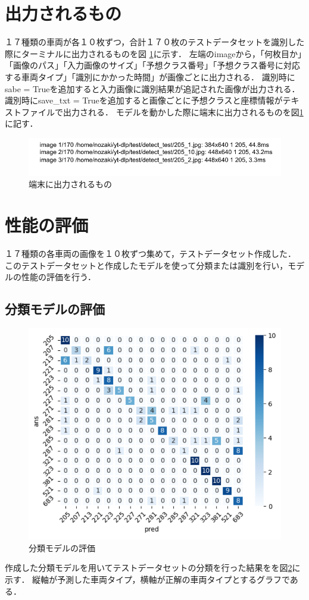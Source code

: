 \section{出力されるもの}
１７種類の車両が各１０枚ずつ，合計１７０枚のテストデータセットを識別した際にターミナルに出力されるものを図 \ref{output}に示す．
左端のimageから，「何枚目か」「画像のパス」「入力画像のサイズ」「予想クラス番号」「予想クラス番号に対応する車両タイプ」「識別にかかった時間」が画像ごとに出力される．
識別時にsabe = Trueを追加すると入力画像に識別結果が追記された画像が出力される．
識別時にsave\_txt = Trueを追加すると画像ごとに予想クラスと座標情報がテキストファイルで出力される．
モデルを動かした際に端末に出力されるものを図\ref{output}に記す．
\begin{figure}	
	\centering
	\includegraphics[width=\linewidth]{fig/a.pdf}
	\caption{端末に出力されるもの}\label{output}
\end{figure}

\section{性能の評価}
１７種類の各車両の画像を１０枚ずつ集めて，テストデータセット作成した．
このテストデータセットと作成したモデルを使って分類または識別を行い，モデルの性能の評価を行う．
\subsection{分類モデルの評価}
\begin{figure}	
	\centering
	\includegraphics[width=\linewidth]{chap4/fig/classify_results.pdf}
	\caption{分類モデルの評価}
	\label{CLS}
\end{figure}
作成した分類モデルを用いてテストデータセットの分類を行った結果をを図\ref{CLS}に示す．
縦軸が予測した車両タイプ，横軸が正解の車両タイプとするグラフである．

